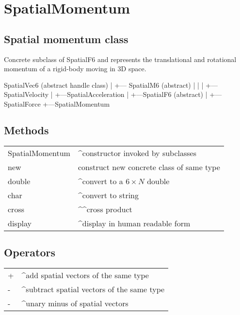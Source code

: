 \hypertarget{SpatialMomentum}{\section*{SpatialMomentum}}
\subsection*{Spatial momentum class}


Concrete subclass of SpatialF6 and represents the
translational and rotational momentum of a rigid-body moving in 3D space.

\begin{Code}
    SpatialVec6 (abstract handle class)
      |
      +--- SpatialM6 (abstract)
      |     |
      |     +---SpatialVelocity
      |     +---SpatialAcceleration
      |
      +---SpatialF6 (abstract)
           |
           +---SpatialForce
           +---SpatialMomentum

\end{Code}

\subsection*{Methods}
\begin{longtable}{lp{120mm}}
SpatialMomentum & \textasciicircum constructor invoked by subclasses\\ 
new & construct new concrete class of same type\\ 
double & \textasciicircum convert to a $6 \times N$ double\\ 
char & \textasciicircum convert to string\\ 
cross & \textasciicircum\textasciicircum cross product\\ 
display & \textasciicircum display in human readable form\\ 
\end{longtable}\vspace{1ex}

\subsection*{Operators}
\begin{longtable}{lp{120mm}}
+ & \textasciicircum add spatial vectors of the same type\\ 
- & \textasciicircum subtract spatial vectors of the same type\\ 
- & \textasciicircum unary minus of spatial vectors\\ 
\end{longtable}\vspace{1ex}


